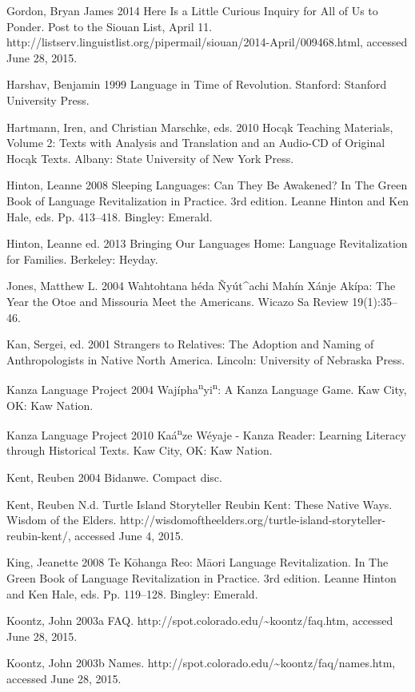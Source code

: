 \documentclass[output=paper]{LSP/langsci}
\begin{document}
\begin{reflist}
Gordon, Bryan James 2014 Here Is a Little Curious Inquiry for All of Us to Ponder. Post to the Siouan List, April 11. http://listserv.linguistlist.org/pipermail/siouan/2014-April/009468.html, accessed June 28, 2015.

Harshav, Benjamin 1999 Language in Time of Revolution. Stanford: Stanford University Press.

Hartmann, Iren, and Christian Marschke, eds. 2010 Hoc\k{a}k Teaching Materials, Volume 2: Texts with Analysis and Translation and an Audio-CD of Original Hoc\k{a}k Texts. Albany: State University of New York Press.

Hinton, Leanne 2008 Sleeping Languages: Can They Be Awakened? In The Green Book of Language Revitalization in Practice. 3rd edition. Leanne Hinton and Ken Hale, eds. Pp. 413--418. Bingley: Emerald.

Hinton, Leanne  ed. 2013 Bringing Our Languages Home: Language Revitalization for Families. Berkeley: Heyday.

Jones, Matthew L. 2004 Wahtohtana h\'eda \~Ny\'ut\^{ }achi Mah\'in X\'anje Ak\'ipa: The Year the Otoe and Missouria Meet the Americans. Wicazo Sa Review 19(1):35--46.

Kan, Sergei, ed. 2001 Strangers to Relatives: The Adoption and Naming of Anthropologists in Native North America. Lincoln: University of Nebraska Press.

Kanza Language Project 2004 Waj\'ipha\textsuperscript{n}yi\textsuperscript{n}: A Kanza Language Game. Kaw City, OK: Kaw Nation.

Kanza Language Project 2010 Ka\'a\textsuperscript{n}ze W\'eyaje - Kanza Reader: Learning Literacy through Historical Texts. Kaw City, OK: Kaw Nation.

Kent, Reuben 2004 Bidanwe. Compact disc.

Kent, Reuben N.d. Turtle Island Storyteller Reubin Kent: These Native Ways. Wisdom of the Elders. http://wisdomoftheelders.org/turtle-island-storyteller-reubin-kent/, accessed June 4, 2015.

King, Jeanette 2008 Te K\=ohanga Reo: M\=aori Language Revitalization. In The Green Book of Language Revitalization in Practice. 3rd edition. Leanne Hinton and Ken Hale, eds. Pp. 119--128. Bingley: Emerald.

Koontz, John 2003a FAQ. http://spot.colorado.edu/\textasciitilde koontz/faq.htm, accessed June 28, 2015.

Koontz, John 2003b Names. http://spot.colorado.edu/\textasciitilde koontz/faq/names.htm, accessed June 28, 2015.


\end{reflist}
\end{document}
